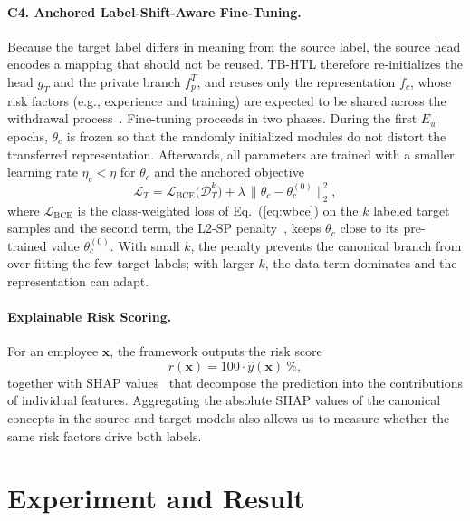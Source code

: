 \documentclass[runningheads]{llncs}
\begin{document}
\paragraph{C4. Anchored Label-Shift-Aware Fine-Tuning.}
Because the target label differs in meaning from the source label, the source head encodes a mapping that should not be reused. TB-HTL therefore re-initializes the head $g_T$ and the private branch $f_p^T$, and reuses only the representation $f_c$, whose risk factors (e.g., experience and training) are expected to be shared across the withdrawal process~\cite{mobley1977,griffeth2000}. Fine-tuning proceeds in two phases. During the first $E_w$ epochs, $\theta_c$ is frozen so that the randomly initialized modules do not distort the transferred representation. Afterwards, all parameters are trained with a smaller learning rate $\eta_c<\eta$ for $\theta_c$ and the anchored objective
\begin{equation}\label{eq:anchor}
\mathcal{L}_T=\mathcal{L}_{\mathrm{BCE}}\big(\mathcal{D}_T^{k}\big)+\lambda\,\big\|\theta_c-\theta_c^{(0)}\big\|_2^2,
\end{equation}
where $\mathcal{L}_{\mathrm{BCE}}$ is the class-weighted loss of Eq.~(\ref{eq:wbce}) on the $k$ labeled target samples and the second term, the L2-SP penalty~\cite{li2018}, keeps $\theta_c$ close to its pre-trained value $\theta_c^{(0)}$. With small $k$, the penalty prevents the canonical branch from over-fitting the few target labels; with larger $k$, the data term dominates and the representation can adapt.

\paragraph{Explainable Risk Scoring.}
For an employee $\mathbf{x}$, the framework outputs the risk score
\begin{equation}\label{eq:risk}
r(\mathbf{x})=100\cdot\hat{y}(\mathbf{x})\ \%,
\end{equation}
together with SHAP values~\cite{lundberg2017} that decompose the prediction into the contributions of individual features. Aggregating the absolute SHAP values of the canonical concepts in the source and target models also allows us to measure whether the same risk factors drive both labels.

\section{Experiment and Result}\label{sec:exp}
\end{document}
